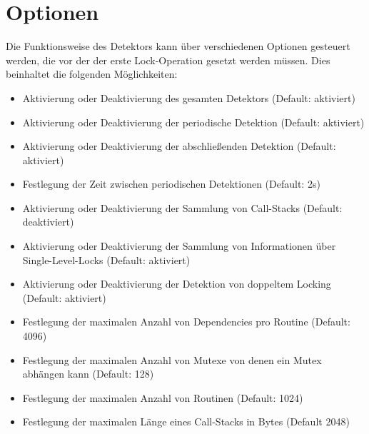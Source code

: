 \section{Optionen}
Die Funktionsweise des Detektors kann über verschiedenen Optionen gesteuert
werden, die vor der der erste Lock-Operation gesetzt werden müssen.
Dies beinhaltet die folgenden Möglichkeiten:
\begin{itemize}
  \item Aktivierung oder Deaktivierung des gesamten Detektors (Default: aktiviert)
  \item Aktivierung oder Deaktivierung der periodische Detektion (Default: aktiviert)
  \item Aktivierung oder Deaktivierung der abschließenden Detektion (Default: aktiviert)
  \item Festlegung der Zeit zwischen periodischen Detektionen (Default: 2s)
  \item Aktivierung oder Deaktivierung der Sammlung von Call-Stacks (Default: deaktiviert)
  \item Aktivierung oder Deaktivierung der Sammlung von Informationen über Single-Level-Locks (Default: aktiviert)
  \item Aktivierung oder Deaktivierung der Detektion von doppeltem Locking (Default: aktiviert)
  \item Festlegung der maximalen Anzahl von Dependencies pro Routine (Default: 4096)
  \item Festlegung der maximalen Anzahl von Mutexe von denen ein Mutex abhängen kann (Default: 128)
  \item Festlegung der maximalen Anzahl von Routinen (Default: 1024)
  \item Festlegung der maximalen Länge eines Call-Stacks in Bytes (Default 2048)
\end{itemize}

\newpage